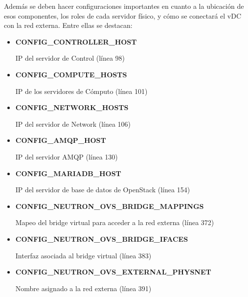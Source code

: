 \documentclass[12pt,a4paper,oneside]{book}
\begin{document}
\vspace{0.5cm}

Además se deben hacer configuraciones importantes en cuanto a la ubicación de esos componentes, los roles de cada servidor físico, y cómo se conectará el vDC con la red externa. Entre ellas se destacan:
\begin{itemize}
    \item \textbf{CONFIG\_CONTROLLER\_HOST} 
    
    IP del servidor de Control (línea 98)
    \item \textbf{CONFIG\_COMPUTE\_HOSTS} 
    
    IP de los servidores de Cómputo (línea 101)
    \item \textbf{CONFIG\_NETWORK\_HOSTS} 
    
    IP del servidor de Network (línea 106)
    \item \textbf{CONFIG\_AMQP\_HOST} 
    
    IP del servidor AMQP (línea 130)
    \item \textbf{CONFIG\_MARIADB\_HOST} 
    
    IP del servidor de base de datos de OpenStack (línea 154)
    \item \textbf{CONFIG\_NEUTRON\_OVS\_BRIDGE\_MAPPINGS} 
    
    Mapeo del bridge virtual para acceder a la red externa (línea 372)
    \item \textbf{CONFIG\_NEUTRON\_OVS\_BRIDGE\_IFACES} 
    
    Interfaz asociada al bridge virtual (línea 383)
    \item \textbf{CONFIG\_NEUTRON\_OVS\_EXTERNAL\_PHYSNET} 
    
    Nombre asignado a la red externa (línea 391)

\end{itemize}
\end{document}
